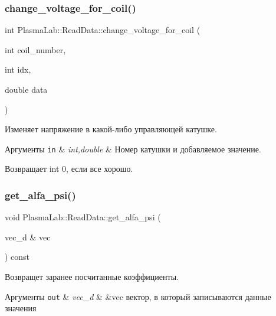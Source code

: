 \subsubsection{\texorpdfstring{change\+\_\+voltage\+\_\+for\+\_\+coil()}{change\_voltage\_for\_coil()}}
{\footnotesize\ttfamily int Plasma\+Lab\+::\+Read\+Data\+::change\+\_\+voltage\+\_\+for\+\_\+coil (\begin{DoxyParamCaption}\item[{int}]{coil\+\_\+number,  }\item[{int}]{idx,  }\item[{double}]{data }\end{DoxyParamCaption})\hspace{0.3cm}{\ttfamily [inline]}}

Изменяет напряжение в какой-\/либо управляющей катушке. 
\begin{DoxyParams}[1]{Аргументы}
\mbox{\tt in}  & {\em int,double} & Номер катушки и добавляемое значение. \\
\hline
\end{DoxyParams}
\begin{DoxyReturn}{Возвращает}
int 0, если все хорошо. 
\end{DoxyReturn}
\mbox{\label{class_plasma_lab_1_1_read_data_acdbcf26ec214f62f3fe6992273c5e8c2}} 
\subsubsection{\texorpdfstring{get\+\_\+alfa\+\_\+psi()}{get\_alfa\_psi()}}
{\footnotesize\ttfamily void Plasma\+Lab\+::\+Read\+Data\+::get\+\_\+alfa\+\_\+psi (\begin{DoxyParamCaption}\item[{vec\+\_\+d \&}]{vec }\end{DoxyParamCaption}) const\hspace{0.3cm}{\ttfamily [inline]}}

Возвращет заранее посчитанные коэффициенты. 
\begin{DoxyParams}[1]{Аргументы}
\mbox{\tt out}  & {\em vec\+\_\+d} & \&vec вектор, в который записываются данные значения \\
\hline
\end{DoxyParams}
\mbox{\label{class_plasma_lab_1_1_read_data_ae43f724b2b8f951b7a853ffe64ffbd45}} 
